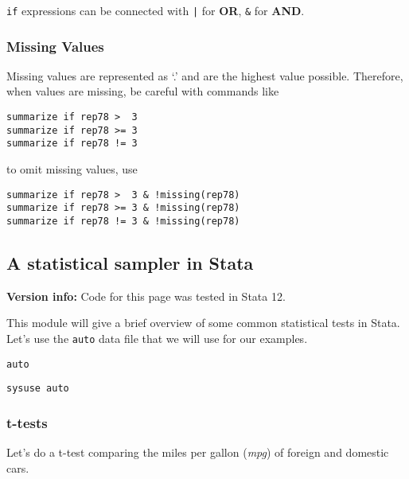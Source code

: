 \lstinline{if} expressions can be connected with \lstinline{|} for \textbf{OR}, \lstinline{&} for \textbf{AND}.

\subsubsection{Missing Values}

Missing values are represented as `.' and are the highest value possible. Therefore, when values are missing, be careful with commands like

\begin{lstlisting}
summarize if rep78 >  3
summarize if rep78 >= 3
summarize if rep78 != 3
\end{lstlisting}

to omit missing values, use

\begin{lstlisting}
summarize if rep78 >  3 & !missing(rep78)
summarize if rep78 >= 3 & !missing(rep78)
summarize if rep78 != 3 & !missing(rep78)
\end{lstlisting}

\subsection{A statistical sampler in Stata}
\textbf{Version info:} Code for this page was tested in Stata 12.

This module will give a brief overview of some common statistical tests in Stata. Let's use the \lstinline{auto} data file that we will use for our examples.

\lstinline{auto}

\begin{lstlisting}
sysuse auto
\end{lstlisting}



\subsubsection{t-tests}

Let's do a t-test comparing the miles per gallon (\textit{mpg}) of foreign and domestic cars.

